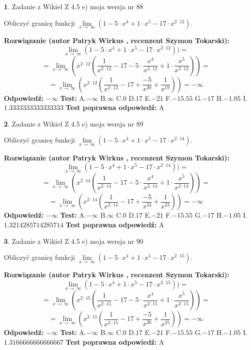 \documentclass[12pt, a4paper]{article}
\theoremstyle{definition} %
\newtheorem{zad}{}
\newcommand{\zadStart}[1]{\begin{zad}#1\newline}
\newcommand{\zadStop}{\end{zad}}
\newcommand{\rozwStart}[2]{\noindent \textbf{Rozwiązanie (autor #1 , recenzent #2): }\newline}
\newcommand{\rozwStop}{\newline}
\newcommand{\odpStart}{\noindent \textbf{Odpowiedź:}\newline}
\newcommand{\odpStop}{\newline}
\newcommand{\testStart}{\noindent \textbf{Test:}\newline}
\newcommand{\testStop}{\newline}
\newcommand{\kluczStart}{\noindent \textbf{Test poprawna odpowiedź:}\newline}
\newcommand{\kluczStop}{\newline}
\begin{document}
\zadStart{Zadanie z Wikieł Z 4.5 e) moja wersja nr 88}


Obliczyć granicę funkcji  $\lim\limits_{x\to\ \infty}(1 - 5 \cdot x^{4}+1 \cdot x^{5}- 17 \cdot x^{2\cdot12})$.
\zadStop
\rozwStart{Patryk Wirkus}{Szymon Tokarski}
$$\lim\limits_{x\to\ \infty}(1 - 5 \cdot x^{4}+1 \cdot x^{5}- 17 \cdot x^{2\cdot12}))=$$
$$=\lim\limits_{x\to\ \infty}(x^{2\cdot12}(\frac{1}{x^{2\cdot12}}-17 -5 \cdot \frac{x^{4}}{x^{2\cdot12}}+1 \cdot \frac{x^{5}}{x^{2\cdot12}}))=$$
$$=\lim\limits_{x\to\ \infty}(x^{2\cdot12}(\frac{1}{x^{2\cdot12}}-17 + \frac{-5}{x^{20}}+ \frac{1}{x^{19}}))=-\infty$$
\rozwStop
\odpStart
$-\infty$
\odpStop
\testStart
A.$-\infty$ B.$\infty$ C.$0$ D.$17$ E.$-21$
F.$-15.55$ G.$-17$
H.$-1.05$
I.$1.3333333333333333$
\testStop
\kluczStart
A
\kluczStop



\zadStart{Zadanie z Wikieł Z 4.5 e) moja wersja nr 89}


Obliczyć granicę funkcji  $\lim\limits_{x\to\ \infty}(1 - 5 \cdot x^{4}+1 \cdot x^{5}- 17 \cdot x^{2\cdot14})$.
\zadStop
\rozwStart{Patryk Wirkus}{Szymon Tokarski}
$$\lim\limits_{x\to\ \infty}(1 - 5 \cdot x^{4}+1 \cdot x^{5}- 17 \cdot x^{2\cdot14}))=$$
$$=\lim\limits_{x\to\ \infty}(x^{2\cdot14}(\frac{1}{x^{2\cdot14}}-17 -5 \cdot \frac{x^{4}}{x^{2\cdot14}}+1 \cdot \frac{x^{5}}{x^{2\cdot14}}))=$$
$$=\lim\limits_{x\to\ \infty}(x^{2\cdot14}(\frac{1}{x^{2\cdot14}}-17 + \frac{-5}{x^{24}}+ \frac{1}{x^{23}}))=-\infty$$
\rozwStop
\odpStart
$-\infty$
\odpStop
\testStart
A.$-\infty$ B.$\infty$ C.$0$ D.$17$ E.$-21$
F.$-15.55$ G.$-17$
H.$-1.05$
I.$1.3214285714285714$
\testStop
\kluczStart
A
\kluczStop



\zadStart{Zadanie z Wikieł Z 4.5 e) moja wersja nr 90}


Obliczyć granicę funkcji  $\lim\limits_{x\to\ \infty}(1 - 5 \cdot x^{4}+1 \cdot x^{5}- 17 \cdot x^{2\cdot15})$.
\zadStop
\rozwStart{Patryk Wirkus}{Szymon Tokarski}
$$\lim\limits_{x\to\ \infty}(1 - 5 \cdot x^{4}+1 \cdot x^{5}- 17 \cdot x^{2\cdot15}))=$$
$$=\lim\limits_{x\to\ \infty}(x^{2\cdot15}(\frac{1}{x^{2\cdot15}}-17 -5 \cdot \frac{x^{4}}{x^{2\cdot15}}+1 \cdot \frac{x^{5}}{x^{2\cdot15}}))=$$
$$=\lim\limits_{x\to\ \infty}(x^{2\cdot15}(\frac{1}{x^{2\cdot15}}-17 + \frac{-5}{x^{26}}+ \frac{1}{x^{25}}))=-\infty$$
\rozwStop
\odpStart
$-\infty$
\odpStop
\testStart
A.$-\infty$ B.$\infty$ C.$0$ D.$17$ E.$-21$
F.$-15.55$ G.$-17$
H.$-1.05$
I.$1.3166666666666667$
\testStop
\kluczStart
A
\kluczStop
\end{document}
